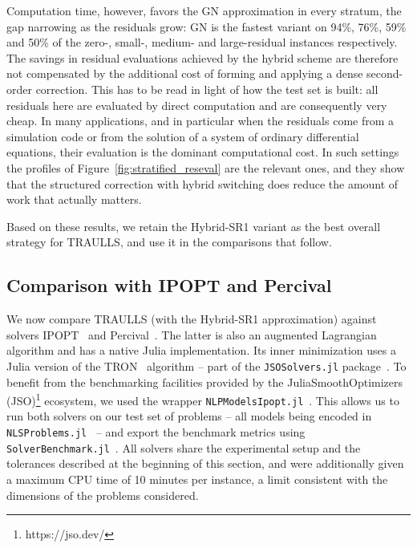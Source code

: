 Computation time, however, favors the GN approximation in every stratum, the gap narrowing as the residuals grow: GN is the fastest variant on 94\%, 76\%, 59\% and 50\% of the zero-, small-, medium- and large-residual instances respectively. The savings in residual evaluations achieved by the hybrid scheme are therefore not compensated by the additional cost of forming and applying a dense second-order correction. This has to be read in light of how the test set is built: all residuals here are evaluated by direct computation and are consequently very cheap. In many applications, and in particular when the residuals come from a simulation code or from the solution of a system of ordinary differential equations, their evaluation is the dominant computational cost. In such settings the profiles of Figure~\ref{fig:stratified_reseval} are the relevant ones, and they show that the structured correction with hybrid switching does reduce the amount of work that actually matters.

Based on these results, we retain the Hybrid-SR1 variant as the best overall strategy for TRAULLS, and use it in the comparisons that follow.

\subsection{Comparison with IPOPT and Percival}\label{subsec:compare_solvers}

We now compare TRAULLS (with the Hybrid-SR1 approximation) against solvers IPOPT~\cite{wachterbiegler:2006} and Percival~\cite{arreckx-etal:2016}. The latter is also an augmented Lagrangian algorithm and has a native Julia implementation. Its inner minimization uses a Julia version of the TRON~\cite{linmore:1999a} algorithm -- part of the \texttt{JSOSolvers.jl} package~\cite{migot-etal:2026}. To benefit from the benchmarking facilities provided by the JuliaSmoothOptimizers (JSO)\footnote{https://jso.dev/} ecosystem, we used the wrapper \texttt{NLPModelsIpopt.jl}~\cite{nlp-models-ipopt-julia}. This allows us to run both solvers on our test set of problems -- all models being encoded in \texttt{NLSProblems.jl}~\cite{nls-problems-julia} -- and export the benchmark metrics using \texttt{SolverBenchmark.jl}~\cite{solver-benchmark-julia}. All solvers share the experimental setup and the tolerances described at the beginning of this section, and were additionally given a maximum CPU time of 10 minutes per instance, a limit consistent with the dimensions of the problems considered.

